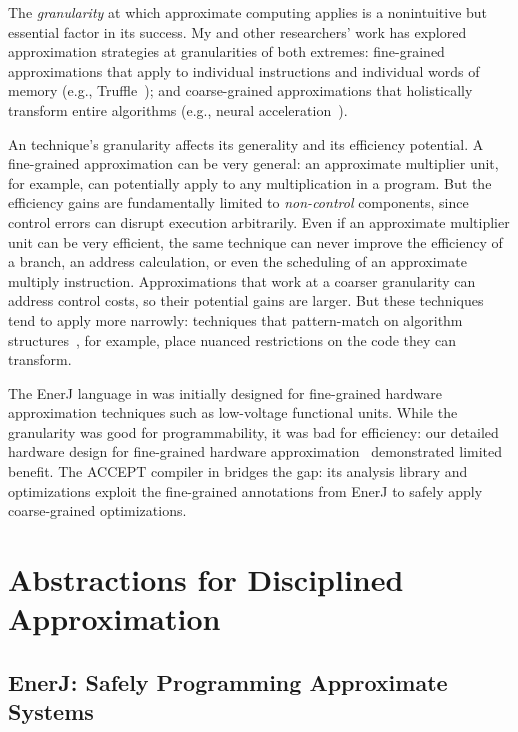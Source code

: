 The \emph{granularity} at which approximate computing applies is a
nonintuitive but essential factor in its success.
My and other researchers' work has explored approximation strategies at
granularities of both extremes:
fine-grained approximations that apply to individual instructions and
individual words of memory (e.g., Truffle~\cite{truffle});
and coarse-grained approximations that holistically transform entire
algorithms (e.g., neural acceleration~\cite{npu}).

An technique's granularity affects its
generality and its efficiency potential.
A fine-grained approximation can be very general:
an approximate multiplier unit, for example, can potentially apply to any
multiplication in a program.
But the efficiency gains are fundamentally limited to \emph{non-control} components,
since control errors can disrupt execution arbitrarily.
Even if an approximate multiplier unit can be very efficient,
the same technique can never
improve the efficiency of a branch, an address calculation,
or even the
scheduling of an approximate multiply instruction.
Approximations that work at a coarser granularity can address control costs,
so their potential gains are larger.
But these techniques tend to apply more narrowly:
techniques that pattern-match on algorithm structures~\cite{paraprox},
for example, place nuanced restrictions on the code they can transform.

The EnerJ language in  was initially designed for
fine-grained hardware approximation techniques such as low-voltage functional
units.
While the granularity was good for programmability, it was bad for efficiency:
our detailed hardware design for fine-grained hardware
approximation~\cite{truffle} demonstrated limited benefit.
The ACCEPT compiler in  bridges the gap: its analysis
library and optimizations exploit the fine-grained annotations from EnerJ to
safely apply coarse-grained optimizations.


\section{Abstractions for Disciplined Approximation}


\subsection{EnerJ: Safely Programming Approximate Systems}
\label{sec:prelim:enerj}

